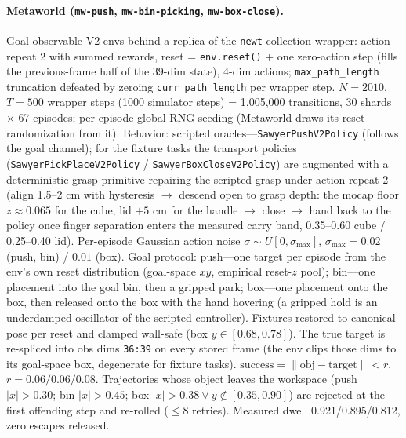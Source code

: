\documentclass[10pt]{article}
\begin{document}
\paragraph{Metaworld (\texttt{mw-push}, \texttt{mw-bin-picking}, \texttt{mw-box-close}).}
Goal-observable V2 envs behind a replica of the \texttt{newt} collection wrapper: action-repeat 2 with summed rewards, reset = \texttt{env.reset()} + one zero-action step (fills the previous-frame half of the 39-dim state), 4-dim actions; \texttt{max\_path\_length} truncation defeated by zeroing \texttt{curr\_path\_length} per wrapper step. $N=2010$, $T=500$ wrapper steps (1000 simulator steps) = 1,005,000 transitions, 30 shards $\times$ 67 episodes; per-episode global-RNG seeding (Metaworld draws its reset randomization from it). Behavior: scripted oracles---\texttt{SawyerPushV2Policy} (follows the goal channel); for the fixture tasks the transport policies (\texttt{SawyerPickPlaceV2Policy} / \texttt{SawyerBoxCloseV2Policy}) are augmented with a deterministic grasp primitive repairing the scripted grasp under action-repeat 2 (align 1.5--2 cm with hysteresis $\rightarrow$ descend open to grasp depth: the mocap floor $z \approx 0.065$ for the cube, lid $+5$ cm for the handle $\rightarrow$ close $\rightarrow$ hand back to the policy once finger separation enters the measured carry band, 0.35--0.60 cube / 0.25--0.40 lid). Per-episode Gaussian action noise $\sigma \sim U[0,\sigma_{\max}]$, $\sigma_{\max}=0.02$ (push, bin) / $0.01$ (box). Goal protocol: push---one target per episode from the env's own reset distribution (goal-space $xy$, empirical reset-$z$ pool); bin---one placement into the goal bin, then a gripped park; box---one placement onto the box, then released onto the box with the hand hovering (a gripped hold is an underdamped oscillator of the scripted controller). Fixtures restored to canonical pose per reset and clamped wall-safe (box $y \in [0.68,0.78]$). The true target is re-spliced into obs dims \texttt{36:39} on every stored frame (the env clips those dims to its goal-space box, degenerate for fixture tasks). $\mathrm{success} = \|\mathrm{obj}-\mathrm{target}\| < r$, $r=0.06/0.06/0.08$. Trajectories whose object leaves the workspace (push $|x|>0.30$; bin $|x|>0.45$; box $|x|>0.38 \lor y \notin [0.35,0.90]$) are rejected at the first offending step and re-rolled ($\leq 8$ retries). Measured dwell 0.921/0.895/0.812, zero escapes released.
\end{document}
